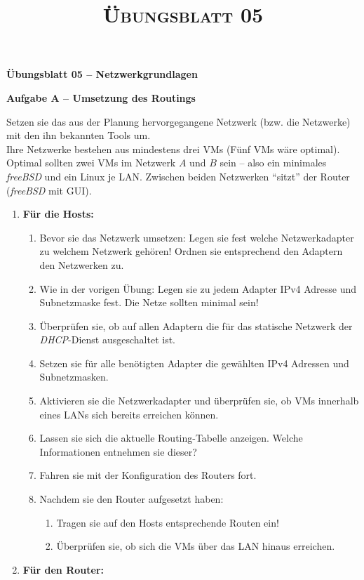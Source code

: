 \documentclass[paper=a4,fontsize=11pt]{scrartcl}%
\title{	
\normalfont \normalsize 
\textsc{Übungsblatt 05}
}
\begin{document}
\begin{center}
\Large{\textbf{Übungsblatt 05 -- Netzwerkgrundlagen}}
\end{center}
\begin{center}\Large{\textbf{Aufgabe A -- Umsetzung des Routings}}\end{center}\vskip0.25in
Setzen sie das aus der Planung hervorgegangene Netzwerk (bzw. die Netzwerke) mit den ihn bekannten Tools um.\\
Ihre Netzwerke bestehen aus mindestens drei VMs (Fünf VMs wäre optimal). Optimal sollten zwei VMs im Netzwerk $A$ und $B$ sein -- also ein minimales \emph{freeBSD} und ein Linux je LAN. Zwischen beiden Netzwerken \enquote{sitzt} der Router (\emph{freeBSD} mit GUI).
\begin{enumerate}
	\item \textbf{Für die Hosts:}\\
	\begin{enumerate}
		\item Bevor sie das Netzwerk umsetzen: Legen sie fest welche Netzwerkadapter zu welchem Netzwerk gehören! Ordnen sie entsprechend den Adaptern den Netzwerken zu.
		\item Wie in der vorigen Übung: Legen sie zu jedem Adapter IPv4 Adresse und Subnetzmaske fest. Die Netze sollten minimal sein!
		\item Überprüfen sie, ob auf allen Adaptern die für das statische Netzwerk der \emph{DHCP}-Dienst ausgeschaltet ist.
		\item Setzen sie für alle benötigten Adapter die gewählten IPv4 Adressen und Subnetzmasken.
		\item Aktivieren sie die Netzwerkadapter und überprüfen sie, ob VMs innerhalb eines LANs sich bereits erreichen können.
		\item Lassen sie sich die aktuelle Routing-Tabelle anzeigen. Welche Informationen entnehmen sie dieser?
		\item Fahren sie mit der Konfiguration des Routers fort.
		\item Nachdem sie den Router aufgesetzt haben:
		\begin{enumerate}
			\item Tragen sie auf den Hosts entsprechende Routen ein!
			\item Überprüfen sie, ob sich die VMs über das LAN hinaus erreichen.
		\end{enumerate}
	\end{enumerate}
	\item \textbf{Für den Router:}\\

\end{enumerate}
\end{document}
